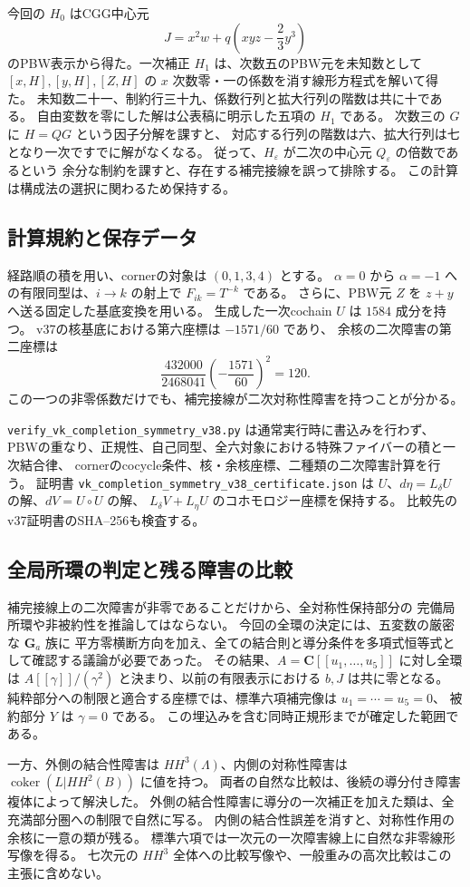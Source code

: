 今回の $H_0$ はCGG中心元
\[
 J=x^2w+q\left(xyz-\frac23y^3\right)
\]
のPBW表示から得た。一次補正 $H_1$ は、次数五のPBW元を未知数として
$[x,H],[y,H],[Z,H]$ の $x$ 次数零・一の係数を消す線形方程式を解いて得た。
未知数二十一、制約行三十九、係数行列と拡大行列の階数は共に十である。
自由変数を零にした解は公表稿に明示した五項の $H_1$ である。
次数三の $G$ に $H=QG$ という因子分解を課すと、
対応する行列の階数は六、拡大行列は七となり一次ですでに解がなくなる。
従って、$H_\varepsilon$ が二次の中心元 $Q_\varepsilon$ の倍数であるという
余分な制約を課すと、存在する補完接線を誤って排除する。
この計算は構成法の選択に関わるため保持する。

\subsection{計算規約と保存データ}

経路順の積を用い、cornerの対象は $(0,1,3,4)$ とする。
$\alpha=0$ から $\alpha=-1$ への有限同型は、$i\to k$ の射上で
$F_{ik}=T^{-k}$ である。
さらに、PBW元 $Z$ を $z+y$ へ送る固定した基底変換を用いる。
生成した一次cochain $U$ は $1584$ 成分を持つ。
v37の核基底における第六座標は $-1571/60$ であり、
余核の二次障害の第二座標は
\[
 \frac{432000}{2468041}\left(-\frac{1571}{60}\right)^2=120.
\]
この一つの非零係数だけでも、補完接線が二次対称性障害を持つことが分かる。

\texttt{verify\_vk\_completion\_symmetry\_v38.py} は通常実行時に書込みを行わず、
PBWの重なり、正規性、自己同型、全六対象における特殊ファイバーの積と一次結合律、
cornerのcocycle条件、核・余核座標、二種類の二次障害計算を行う。
証明書 \texttt{vk\_completion\_symmetry\_v38\_certificate.json} は
$U$、$d\eta=L_\delta U$ の解、$dV=U\circ U$ の解、
$L_\delta V+L_\eta U$ のコホモロジー座標を保持する。
比較先のv37証明書のSHA--256も検査する。

\subsection{全局所環の判定と残る障害の比較}

補完接線上の二次障害が非零であることだけから、全対称性保持部分の
完備局所環や非被約性を推論してはならない。
今回の全環の決定には、五変数の厳密な $\mathbf G_a$ 族に
平方零横断方向を加え、全ての結合則と導分条件を多項式恒等式として確認する議論が必要であった。
その結果、$A=\mathbf C[[u_1,\ldots,u_5]]$ に対し全環は
$A[[\gamma]]/(\gamma^2)$ と決まり、以前の有限表示における $b,J$ は共に零となる。
純粋部分への制限と適合する座標では、標準六項補完像は $u_1=\cdots=u_5=0$、
被約部分 $Y$ は $\gamma=0$ である。
この埋込みを含む同時正規形までが確定した範囲である。

一方、外側の結合性障害は $HH^3(\Lambda)$、内側の対称性障害は
$\operatorname{coker}(L|HH^2(B))$ に値を持つ。
両者の自然な比較は、後続の導分付き障害複体によって解決した。
外側の結合性障害に導分の一次補正を加えた類は、全充満部分圏への制限で自然に写る。
内側の結合性誤差を消すと、対称性作用の余核に一意の類が残る。
標準六項では一次元の一次障害線上に自然な非零線形写像を得る。
七次元の $HH^3$ 全体への比較写像や、一般重みの高次比較はこの主張に含めない。
